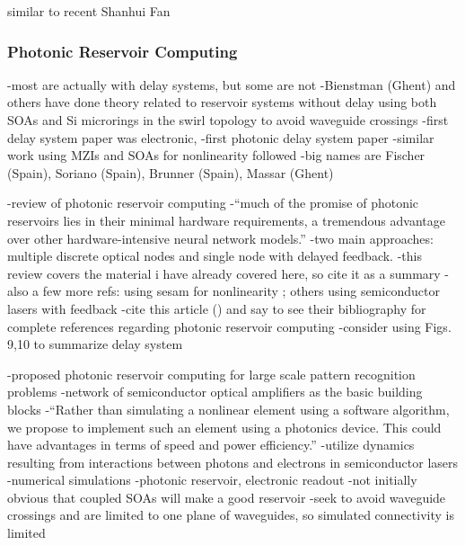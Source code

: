 \vspace{3em}
\cite{waps1987} similar to recent Shanhui Fan

\subsubsection{Photonic Reservoir Computing}
-most are actually with delay systems, but some are not
-Bienstman (Ghent) and others have done theory related to reservoir systems without delay using both SOAs and Si microrings in the swirl topology to avoid waveguide crossings
-first delay system paper was electronic, \cite{apso2011}
-first photonic delay system paper \cite{laso2012}
-similar work using MZIs and SOAs for nonlinearity followed
-big names are Fischer (Spain), Soriano (Spain), Brunner (Spain), Massar (Ghent)


\cite{vabr2017}
-review of photonic reservoir computing
-``much of the promise of photonic reservoirs lies in their minimal hardware requirements, a tremendous advantage over other hardware-intensive neural network models.''
-two main approaches: multiple discrete optical nodes and single node with delayed feedback.
-this review covers the material i have already covered here, so cite it as a summary
-also a few more refs: using sesam for nonlinearity \cite{dedu2014}; others using semiconductor lasers with feedback \cite{ngve2014}
-cite this article (\cite{vabr2017}) and say to see their bibliography for complete references regarding photonic reservoir computing
-consider using Figs. 9,10 to summarize delay system

\vspace{3em}

\cite{vadi2008}
-proposed photonic reservoir computing for large scale pattern recognition problems
-network of semiconductor optical amplifiers as the basic building blocks
-``Rather than simulating a nonlinear element using a software algorithm, we propose to implement such an element using a photonics device. This could have advantages in terms of speed and power efficiency.''
-utilize dynamics resulting from interactions between photons and electrons in semiconductor lasers
-numerical simulations
-photonic reservoir, electronic readout
-not initially obvious that coupled SOAs will make a good reservoir
-seek to avoid waveguide crossings and are limited to one plane of waveguides, so simulated connectivity is limited

